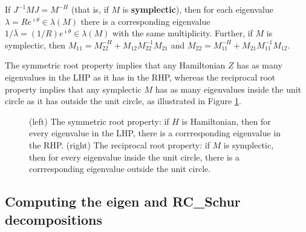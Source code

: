 \begin{fact} \label{fact.A.D.D.Ed}
If $J^{-1} M J = M^{-H}$ (that is, if $M$ is {\bf symplectic}), then for each eigenvalue $\lambda=R e^{\imath \theta}  \in \lambda(M)$
there is a corresponding eigenvalue $1/\bar\lambda = (1/R) e^{\imath \theta} \in \lambda(M)$
with the same multiplicity.  Further, if $M$ is symplectic, then $M_{11}=M_{22}^{-H}+M_{12} M_{22}^{-1} M_{21}$ and $M_{22}=M_{11}^{-H}+M_{21} M_{11}^{-1} M_{12}$.
\end{fact}

The symmetric root property implies that any Hamiltonian $Z$ has as many eigenvalues in the LHP as it has in the RHP, whereas
the reciprocal root property implies that any symplectic $M$ has as many eigenvalues inside the unit circle as it has outside the unit circle, as illustrated in Figure \ref{fig:symroot}.
\clearpage

\begin{figure}[h!]
\centerline{\qquad \qquad {}}
\caption{(left) The symmetric root property: if $H$ is Hamiltonian, then for every eigenvalue in the LHP, there is a
corrresponding eigenvalue in the RHP.
(right) The reciprocal root property: if $M$ is symplectic, then for every eigenvalue inside the unit circle, there is a
corrresponding eigenvalue outside the unit circle.}\label{fig:symroot}
\end{figure}

\subsection{Computing the eigen and RC_Schur decompositions}\label{sec.A.D.E}

 \label{sec.A.D.E.A}

